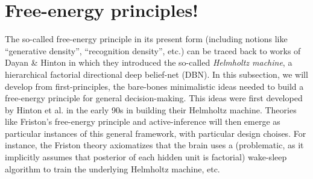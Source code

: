 \documentclass[10pt,letterpaper]{article}
\begin{document}
\small
% 
% 



\appendix
\section{Free-energy principles!}
The so-called free-energy principle in its present form (including notions like ``generative density'', ``recognition density'', etc.) can be traced back to works of Dayan \& Hinton \citep{dayan1995helmholtz} in which they introduced the so-called \textit{Helmholtz machine}, a hierarchical factorial directional deep belief-net (DBN).
In this subsection, we will develop from first-principles, the bare-bones minimalistic ideas needed to build a free-energy principle for general decision-making. This ideas were first developed by Hinton et al. in the early 90s in building their Helmholtz machine. Theories like Friston's free-energy principle and active-inference will then emerge as particular instances of this general framework, with particular design choises. For instance, the Friston theory axiomatizes that the brain uses a (problematic, as it implicitly assumes that posterior of each hidden unit is factorial) wake-sleep algorithm to train the underlying Helmholtz machine, etc.

\end{document}
